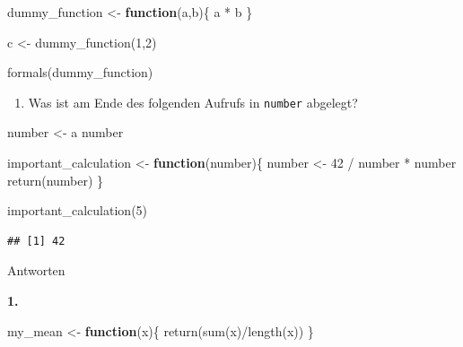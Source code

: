 \documentclass[
]{book}
\newenvironment{Shaded}{\begin{snugshade}}{\end{snugshade}}
\newcommand{\ControlFlowTok}[1]{\textcolor[rgb]{0.13,0.29,0.53}{\textbf{#1}}}
\newcommand{\DecValTok}[1]{\textcolor[rgb]{0.00,0.00,0.81}{#1}}
\newcommand{\FunctionTok}[1]{\textcolor[rgb]{0.00,0.00,0.00}{#1}}
\newcommand{\NormalTok}[1]{#1}
\newcommand{\OtherTok}[1]{\textcolor[rgb]{0.56,0.35,0.01}{#1}}
\newcommand{\SpecialCharTok}[1]{\textcolor[rgb]{0.00,0.00,0.00}{#1}}
\newcommand{\StringTok}[1]{\textcolor[rgb]{0.31,0.60,0.02}{#1}}
\providecommand{\tightlist}{%
  \setlength{\itemsep}{0pt}\setlength{\parskip}{0pt}}
\begin{document}
\begin{Shaded}
\begin{Highlighting}[]
\NormalTok{dummy\_function }\OtherTok{\textless{}{-}} \ControlFlowTok{function}\NormalTok{(a,b)\{}
\NormalTok{  a }\SpecialCharTok{*}\NormalTok{ b}
\NormalTok{\}}

\NormalTok{c }\OtherTok{\textless{}{-}} \FunctionTok{dummy\_function}\NormalTok{(}\DecValTok{1}\NormalTok{,}\DecValTok{2}\NormalTok{)}

\FunctionTok{formals}\NormalTok{(dummy\_function)}
\end{Highlighting}
\end{Shaded}

\begin{enumerate}
\def\labelenumi{\arabic{enumi}.}
\setcounter{enumi}{2}
\tightlist
\item
  Was ist am Ende des folgenden Aufrufs in \texttt{number} abgelegt?
\end{enumerate}

\begin{Shaded}
\begin{Highlighting}[]
\NormalTok{number }\OtherTok{\textless{}{-}} \StringTok{\textquotesingle{}a number\textquotesingle{}}

\NormalTok{important\_calculation }\OtherTok{\textless{}{-}} \ControlFlowTok{function}\NormalTok{(number)\{}
\NormalTok{  number }\OtherTok{\textless{}{-}} \DecValTok{42} \SpecialCharTok{/}\NormalTok{ number }\SpecialCharTok{*}\NormalTok{ number}
  \FunctionTok{return}\NormalTok{(number)}
\NormalTok{\}}

\FunctionTok{important\_calculation}\NormalTok{(}\DecValTok{5}\NormalTok{)}
\end{Highlighting}
\end{Shaded}

\begin{verbatim}
## [1] 42
\end{verbatim}

Antworten

\textbf{1.}

\begin{Shaded}
\begin{Highlighting}[]
\NormalTok{my\_mean }\OtherTok{\textless{}{-}} \ControlFlowTok{function}\NormalTok{(x)\{}
  \FunctionTok{return}\NormalTok{(}\FunctionTok{sum}\NormalTok{(x)}\SpecialCharTok{/}\FunctionTok{length}\NormalTok{(x))}
\NormalTok{\}}
\end{Highlighting}
\end{Shaded}
\end{document}
